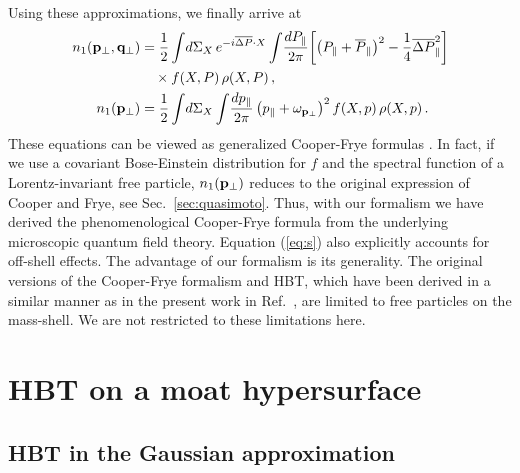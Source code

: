 \documentclass[reprint,superscriptaddress,english,preprintnumbers,amsmath,amssymb,aps,prx]{revtex4-2}
\def\Sec#1{Sec.~\ref{#1}}
\begin{document}
Using these approximations, we finally arrive at
\begin{align}\label{eq:s}
\begin{split}
n_1(\bold{p}_\perp,\bold{q}_\perp)&= \frac{1}{2}\int\!d\Sigma_X\, e^{-i\overline{\Delta P}\cdot X} \int\! \frac{dP_\parallel}{2\pi}
\bigg[ 
\big( P_\parallel + \overline{P}_\parallel \big)^2 - \frac{1}{4} \overline{\Delta P}_\parallel^2
 \bigg]\\
&\quad\times f(X,P)\,\rho(X,P)\,,\\
%
n_1(\bold{p}_\perp) &=\frac{1}{2}\int\!d\Sigma_X\int\! \frac{dp_\parallel}{2\pi}\,
\big( p_\parallel + \omega_{\bold{p}_\perp} \big)^2\, f(X,p)\,\rho(X,p)\,.
\end{split}
\end{align}
These equations can be viewed as generalized Cooper-Frye formulas \cite{Cooper:1974mv}.
In fact, if we use a covariant Bose-Einstein distribution for $f$ and the spectral function of a Lorentz-invariant free particle, $n_1(\bold{p}_\perp)$ reduces to the original expression of Cooper and Frye, see \Sec{sec:quasimoto}. Thus, with our formalism we have derived the phenomenological Cooper-Frye formula from the underlying microscopic quantum field theory. 
Equation (\ref{eq:s}) also explicitly accounts for off-shell effects.
The advantage of our formalism is its generality. The original versions of the Cooper-Frye formalism and HBT, which have been derived in a similar manner as in the present work in Ref.\ \cite{Makhlin:1986fd}, are limited to free particles on the mass-shell. We are not restricted to these limitations here.








\section{HBT on a moat hypersurface}\label{sec:moatHBT}


\subsection{HBT in the Gaussian approximation}\label{sec:HBTG}
\end{document}
